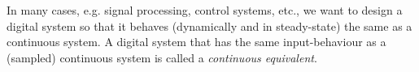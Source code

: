 In many cases, e.g. signal processing, control systems, etc., we want to design
a digital system so that it behaves
(dynamically and in steady-state) the same as a continuous
system. A digital system that has the same input-behaviour as
a (sampled) continuous system is called a \emph{continuous
  equivalent}.

\endinput
